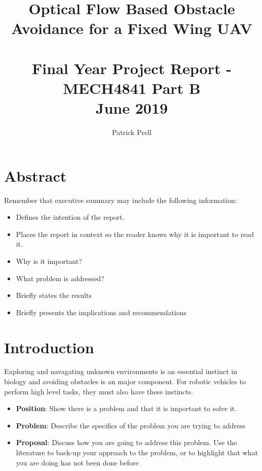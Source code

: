 \documentclass{UoNMCHA}
\numberwithin{equation}{section}
\begin{document}

\title{Optical Flow Based Obstacle Avoidance for a Fixed Wing UAV\\ \ \\
{\small Final Year Project Report - MECH4841 Part B  \\June 2019}}
\author[UoNMCHA]{Patrick Prell}
\address[UoNMCHA]{
Student of Mechatronics Engineering,\\
The University of Newcastle, Callaghan, NSW 2308, AUSTRALIA \\
Student Number: 3204734 \\
E-mail: \href{mailto:Patrick.Prell@uon.edu.au}{\textsf{Patrick.Prell@uon.edu.au}}}
\maketitle
\onecolumn

\vspace{-5mm}
\section*{Abstract}
\vspace{-3mm}
Remember that executive summary may include the following information:
\begin{itemize}
    \item Defines the intention of the report.
    \item Places the report in context so the reader knows why it is important to read it.
    \item Why is it important?
    \item What problem is addressed?
    \item Briefly states the results
    \item Briefly presents the implications and recommendations
\end{itemize}
\newpage
\tableofcontents
\newpage
\lstlistoflistings
\newpage
\section{Introduction}

Exploring and navagating unknown environments is an essential instinct in biology and avoiding obstacles is an major component. For robotic vehicles to perform high level tasks, they must also have these instincts.

\begin{itemize}
    \item \textbf{Position}: Show there is a problem and that it is important to solve it.
    \item \textbf{Problem}: Describe the specifics of the problem you are trying to address
    \item \textbf{Proposal}: Discuss how you are going to address this problem. Use the literature to back-up your approach to the problem, or to highlight that what you are doing has not been done before
\end{itemize}
\end{document}
